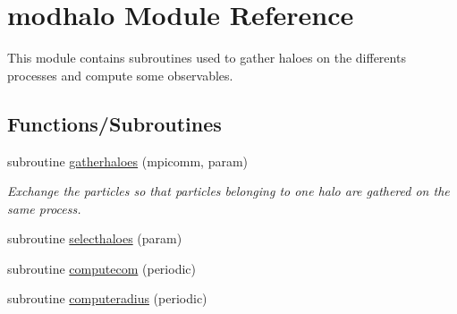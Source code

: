\hypertarget{namespacemodhalo}{}\section{modhalo Module Reference}
\label{namespacemodhalo}


This module contains subroutines used to gather haloes on the differents processes and compute some observables.  


\subsection*{Functions/\+Subroutines}
\begin{DoxyCompactItemize}
\item 
subroutine \hyperlink{namespacemodhalo_acf1576354acf16b205a17c83983b248a}{gatherhaloes} (mpicomm, param)
\begin{DoxyCompactList}\small\item\em Exchange the particles so that particles belonging to one halo are gathered on the same process. \end{DoxyCompactList}\item 
subroutine \hyperlink{namespacemodhalo_a4af0af98272044df8ab650e79d2516d6}{selecthaloes} (param)
\item 
subroutine \hyperlink{namespacemodhalo_ac4afe524dd9d15d21ce67171c4a7ba70}{computecom} (periodic)
\item 
subroutine \hyperlink{namespacemodhalo_a873e8c6a5fd11756e18c33dd7a08ab7d}{computeradius} (periodic)
\end{DoxyCompactItemize}
